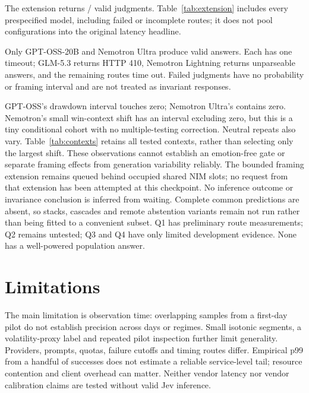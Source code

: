 \documentclass[11pt]{article}
\begin{document}
The extension returns \FramingValid{}/\FramingAttempted{} valid judgments.
Table~\ref{tab:extension} includes every prespecified model, including failed or
incomplete routes; it does not pool configurations into the original latency
headline.

Only GPT-OSS-20B and Nemotron Ultra produce valid answers. Each has one timeout;
GLM-5.3 returns HTTP 410, Nemotron Lightning returns unparseable answers, and
the remaining routes time out. Failed judgments have no probability or framing
interval and are not treated as invariant responses.

\begin{table}[htbp]\centering\scriptsize

\caption{Every non-neutral framing condition in the completed extension for
models with valid pairs. Shifts are signed probability differences from neutral;
flip fractions compare thresholded decisions. Brackets are unadjusted descriptive
paired-state bootstrap intervals. Degenerate zero-flip intervals do not establish
population invariance; independent time-block CIs remain unavailable.}
\label{tab:contexts}\end{table}

GPT-OSS's drawdown interval touches zero; Nemotron Ultra's contains zero.
Nemotron's small win-context shift has an interval excluding zero, but this is a
tiny conditional cohort with no multiple-testing correction. Neutral repeats also
vary. Table~\ref{tab:contexts} retains all tested contexts, rather than selecting
only the largest shift. These observations cannot establish an emotion-free gate
or separate framing effects from generation variability reliably.
\else
The bounded framing extension remains queued behind occupied shared NIM slots;
no request from that extension has been attempted at this checkpoint. No
inference outcome or invariance conclusion is inferred from waiting.
\fi
Complete common predictions are absent, so stacks, cascades and
remote abstention variants remain not run rather than being fitted to a convenient
subset. Q1 has preliminary route measurements; Q2 remains untested; Q3 and Q4
have only limited development evidence. None has a well-powered population answer.

\section{Limitations}
The main limitation is observation time: overlapping samples from a first-day
pilot do not establish precision across days or regimes. Small isotonic segments,
a volatility-proxy label and repeated pilot inspection further limit generality.
Providers, prompts, quotas, failure cutoffs and timing routes differ. Empirical
p99 from a handful of successes does not estimate a reliable service-level tail;
resource contention and client overhead can matter. Neither vendor latency nor
vendor calibration claims are tested without valid Jev inference.
\end{document}

